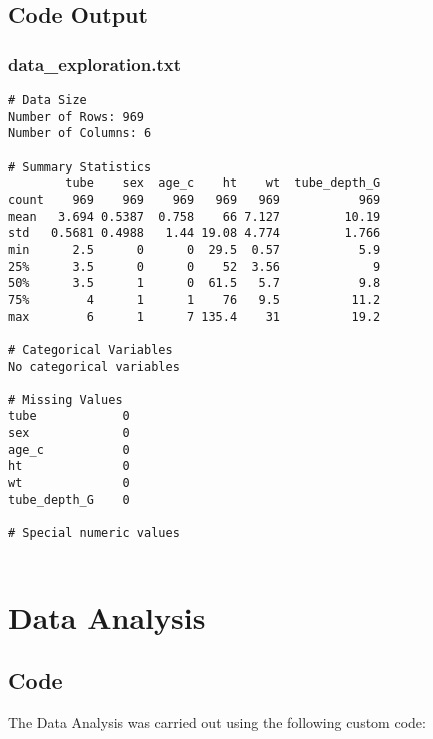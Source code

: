 \documentclass[11pt]{article}
\begin{document}
\subsection{Code Output}

\subsubsection*{data\_exploration.txt}

\begin{Verbatim}[tabsize=4]
# Data Size
Number of Rows: 969
Number of Columns: 6

# Summary Statistics
        tube    sex  age_c    ht    wt  tube_depth_G
count    969    969    969   969   969           969
mean   3.694 0.5387  0.758    66 7.127         10.19
std   0.5681 0.4988   1.44 19.08 4.774         1.766
min      2.5      0      0  29.5  0.57           5.9
25%      3.5      0      0    52  3.56             9
50%      3.5      1      0  61.5   5.7           9.8
75%        4      1      1    76   9.5          11.2
max        6      1      7 135.4    31          19.2

# Categorical Variables
No categorical variables

# Missing Values
tube            0
sex             0
age_c           0
ht              0
wt              0
tube_depth_G    0

# Special numeric values


\end{Verbatim}

\section{Data Analysis}
\subsection{{Code}}
The Data Analysis was carried out using the following custom code:
\end{document}

